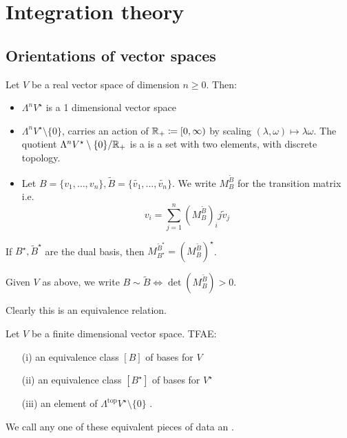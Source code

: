 \chapter{Integration theory}

\section{Orientations of vector spaces}

Let \(V\) be a real vector space of dimension \(n\geq 0\). Then:
\begin{itemize}
    \item \(\Lambda^n V^\star\) is a 1 dimensional vector space 
    \item \(\Lambda^nV^\star\setminus\{0\}\), carries an action of  \(\mathbb{R}_+\coloneqq [0,\infty)\)
          by scaling \((\lambda,\omega)\mapsto \lambda \omega\). The quotient \(\Lambda^n V^\star\setminus\{0\}/\mathbb{R}_+\) is a 
          is a set with two elements, with discrete topology. 
    \item Let \(B=\{v_1,\dots,v_n\},\tilde{B}=\{\tilde{v_1},\dots,\tilde{v_n}\}\). We write \(M_B^{\tilde{B}}\) for the transition matrix 
          i.e. \[v_i=\sum_{j=1}^n (M_B^{\tilde{B}})_ij \tilde{v}_j\]
\end{itemize}

 If \(B^\star,\tilde{B}^\star\) are the dual basis, then \(M_{B^\star}^{\tilde{B}^\star}=(M_B^{\tilde{B}})^\star\).

\begin{definition*}
    Given \(V\) as above, we write \(B\sim \tilde{B}\iff \det(M_B^{\tilde{B}})>0\).
\end{definition*}

Clearly this is an equivalence relation.

\begin{lemma}\label{lem:11.1}
    Let \(V\) be a finite dimensional vector space. TFAE:
    \begin{enumerate}
        \item[(i)] an equivalence class \([B]\) of bases for \(V\)
        \item[(ii)] an equivalence class \([B^\star]\) of bases for \(V^\star\)
        \item[(iii)] an element of \(\Lambda^{\text{top}}V^\star\setminus \{0\}\) .  
    \end{enumerate}
    We call any one of these equivalent pieces of data an .
\end{lemma}

